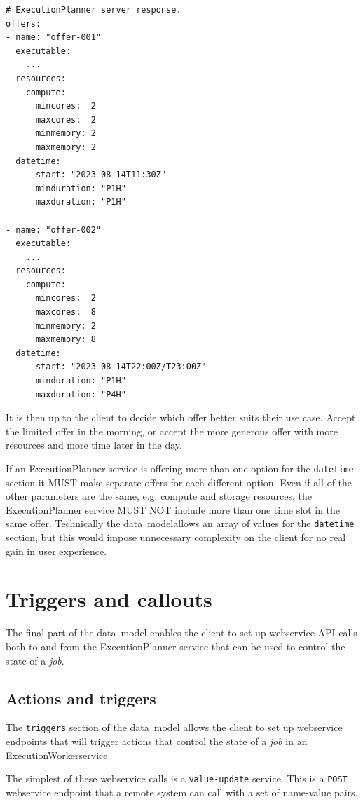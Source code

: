 \documentclass[11pt,a4paper]{ivoa}
\newcommand{\datamodel} {data~model}
\newcommand{\webservice} {webservice}
\newcommand{\execplanner} {ExecutionPlanner}
\newcommand{\execworker} {ExecutionWorker}
\newcommand{\codeword}[1] {\texttt{#1}}
\newcommand{\job} {\textit{job}}
\begin{document}
\begin{lstlisting}[]
# ExecutionPlanner server response.
offers:
- name: "offer-001"
  executable:
    ...
  resources:
    compute:
      mincores:  2
      maxcores:  2
      minmemory: 2
      maxmemory: 2
  datetime:
    - start: "2023-08-14T11:30Z"
      minduration: "P1H"
      maxduration: "P1H"

- name: "offer-002"
  executable:
    ...
  resources:
    compute:
      mincores:  2
      maxcores:  8
      minmemory: 2
      maxmemory: 8
  datetime:
    - start: "2023-08-14T22:00Z/T23:00Z"
      minduration: "P1H"
      maxduration: "P4H"
\end{lstlisting}

It is then up to the client to decide which offer better suits their use case.
Accept the limited offer in the morning, or accept the more generous offer with
more resources and more time later in the day.

If an \execplanner{} service is offering more than one option for the \codeword{datetime}
section it MUST make separate offers for each different option.
Even if all of the other parameters are the same, e.g. compute and storage resources, the
\execplanner{} service MUST NOT include more than one time slot in the same offer.
Technically the \datamodel allows an array of values for the \codeword{datetime} section,
but this would impose unnecessary complexity on the client for no real gain in user experience.

\section{Triggers and callouts}
\label{triggers-callouts}

The final part of the \datamodel{} enables the client to set up
\webservice{} API calls both to and from the \execplanner{} service
that can be used to control the state of a \job{}.

\subsection{Actions and triggers}
\label{triggers}

The \codeword{triggers} section of the \datamodel{} allows the client to
set up \webservice{} endpoints that will trigger actions that control the
state of a \job{} in an \execworker service.

The simplest of these \webservice{} calls is a \codeword{value-update} service.
This is a \codeword{POST} \webservice{} endpoint that a remote system can
call with a set of name-value pairs.
\end{document}
